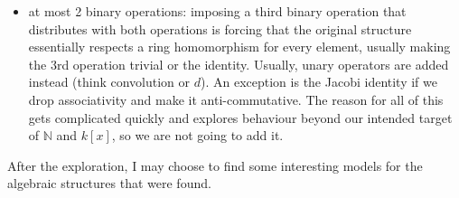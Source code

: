 \documentclass{article}
\newcommand{\N}{{\mathbb{N}}}
\newcommand{\id}{{\operatorname{id}}}
\newcommand{\End}{{\operatorname{End}}}
\begin{document}
\begin{itemize}
        \textcolor{red}{we want faithful reps. If there is an id then automatically, If not we must not have
        ``annihilators''. Think about whether you need to consider this.}

        As $\N$ has this property and we can internet multiplying numbers as getting integral boxes, we shall
        desires this linearity. We shall think about what it means to have distributivity in the case of
        polynomial rings, especially since $x\cdot (-)$ is so important for finding char and min polynomials,
        not to even mention its use in representation theory.


        The following commutative diagram is placed to represent the linearity of $\End$ in what may be more
        familiar categorical language to some readers:
        \[
          \begin{tikzcd}
R\times R\times R \arrow[r, "{(\id, +)}"] \arrow[d, "{(\cdot, \cdot)}"] & R\times R \arrow[d, "\cdot"] \\
R\times R \arrow[r, "+"]                                                & R
\end{tikzcd}\qquad
\begin{tikzcd}
{(r,s,t)} \arrow[r, "{(\id, +)}"] \arrow[d, "{(\cdot, \cdot)}"] & {(r, s+t)} \arrow[d, "\cdot"]      \\
{(r\cdot s, r\cdot t)} \arrow[r, "+"]                           & r\cdot s + r\cdot t = r\cdot (s+t)
\end{tikzcd}
        \]
      \item at most 2 binary operations: imposing a third binary operation that distributes with both
        operations is forcing that the original structure essentially respects a ring homomorphism for every
        element, usually making the 3rd operation trivial or the identity. Usually, unary operators are added
        instead (think convolution or $d$). An exception is the Jacobi identity if we drop associativity and
        make it anti-commutative. The reason for all of this gets complicated quickly and explores behaviour
        beyond our intended target of $\N$ and $k[x]$, so we are not going to add it.
\end{itemize}

After the exploration, I may choose to find some interesting models for the algebraic structures that were
found.
\end{document}
